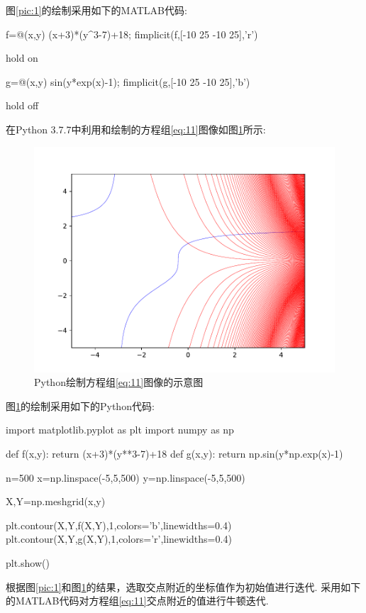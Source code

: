 \documentclass[cn,12pt,founder,a4paper]{elegantpaper}
\begin{document}
图\ref{pic:1}的绘制采用如下的M{\footnotesize{ATLAB}}代码:
\begin{Matlab}
  f=@(x,y) (x+3)*(y^3-7)+18;
  fimplicit(f,[-10 25 -10 25],'r') 

  hold on

  g=@(x,y) sin(y*exp(x)-1);
  fimplicit(g,[-10 25 -10 25],'b')

  hold off
\end{Matlab}\newpage\par
在Python 3.7.7中利用和绘制的方程组\eqref{eq:11}图像如图\ref{pic:2}所示:
\begin{figure}[H]
  \centering
  \includegraphics[scale=0.80]{image/Python.pdf}
  \caption{Python绘制方程组\eqref{eq:11}图像的示意图}
  \label{pic:2}
\end{figure}\par
图\ref{pic:2}的绘制采用如下的Python代码:
\begin{Python}
  import matplotlib.pyplot as plt
  import numpy as np
  
  def f(x,y):
      return (x+3)*(y**3-7)+18
  def g(x,y):
      return np.sin(y*np.exp(x)-1)
  
  n=500
  x=np.linspace(-5,5,500)
  y=np.linspace(-5,5,500)
  
  X,Y=np.meshgrid(x,y)
  
  plt.contour(X,Y,f(X,Y),1,colors='b',linewidths=0.4)    
  plt.contour(X,Y,g(X,Y),1,colors='r',linewidths=0.4)
  
  plt.show()
\end{Python}\par
根据图\ref{pic:1}和图\ref{pic:2}的结果，选取交点附近的坐标值作为初始值进行迭代. 采用如下的{M\footnotesize{ATLAB}}代码对方程组\eqref{eq:11}交点附近的值进行牛顿迭代.\newpage\par
\end{document}
